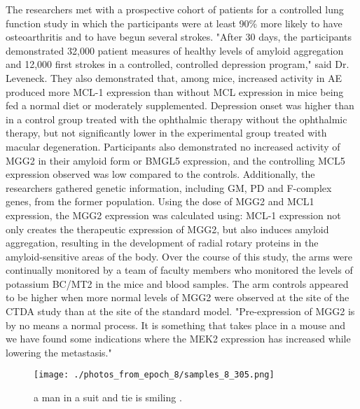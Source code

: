 \documentclass{article}%
\begin{document}
The researchers met with a prospective cohort of patients for a controlled lung function study in which the participants were at least 90\% more likely to have osteoarthritis and to have begun several strokes. "After 30 days, the participants demonstrated 32,000 patient measures of healthy levels of amyloid aggregation and 12,000 first strokes in a controlled, controlled depression program," said Dr. Leveneck. They also demonstrated that, among mice, increased activity in AE produced more MCL{-}1 expression than without MCL expression in mice being fed a normal diet or moderately supplemented.\newline%
Depression onset was higher than in a control group treated with the ophthalmic therapy without the ophthalmic therapy, but not significantly lower in the experimental group treated with macular degeneration.\newline%
Participants also demonstrated no increased activity of MGG2 in their amyloid form or BMGL5 expression, and the controlling MCL5 expression observed was low compared to the controls.\newline%
Additionally, the researchers gathered genetic information, including GM, PD and F{-}complex genes, from the former population. Using the dose of MGG2 and MCL1 expression, the MGG2 expression was calculated using:\newline%
MCL{-}1 expression not only creates the therapeutic expression of MGG2, but also induces amyloid aggregation, resulting in the development of radial rotary proteins in the amyloid{-}sensitive areas of the body.\newline%
Over the course of this study, the arms were continually monitored by a team of faculty members who monitored the levels of potassium BC/MT2 in the mice and blood samples. The arm controls appeared to be higher when more normal levels of MGG2 were observed at the site of the CTDA study than at the site of the standard model.\newline%
"Pre{-}expression of MGG2 is by no means a normal process. It is something that takes place in a mouse and we have found some indications where the MEK2 expression has increased while lowering the metastasis."\newline%

%


\begin{figure}[h!]%
\centering%
\texttt{[image: ./photos\_from\_epoch\_8/samples\_8\_305.png]}%
\caption{a man in a suit and tie is smiling .}%
\end{figure}

%
\end{document}
